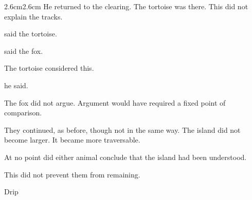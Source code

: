 \begin{adjustwidth}{2.6cm}{2.6cm}
He returned to the clearing. The tortoise was there. This did not explain the tracks.

\vspace{2em}

 said the tortoise.

\vspace{2em}

 said the fox.

\vspace{2em}

The tortoise considered this.

\vspace{2em}

 he said.

\vspace{2em}

The fox did not argue. Argument would have required a fixed point of comparison.

\vspace{2em}

They continued, as before, though not in the same way. The island did not become
larger. It became more traversable.

\vspace{2em}

At no point did either animal conclude that the island had been understood.

\medskip

This did not prevent them from remaining.

\vspace{2em}


\vspace{2em}

Drip

\end{adjustwidth}
